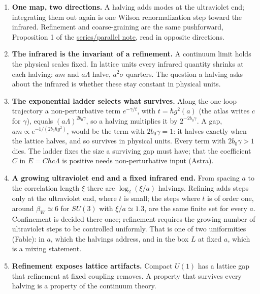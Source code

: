 \documentclass[11pt,a4paper]{article}
\newcommand{\tightlist}{\setlength{\itemsep}{0pt}\setlength{\parskip}{0pt}}
\begin{document}
\begin{enumerate}
\def\labelenumi{\arabic{enumi}.}
\tightlist
\item
  \textbf{One map, two directions.} A halving adds modes at the
  ultraviolet end; integrating them out again is one Wilson
  renormalization step toward the infrared. Refinement and
  coarse-graining are the same pushforward, Proposition 1 of the
  \href{series-parallel-gauge-refinement.md}{series/parallel note}, read
  in opposite directions.
\item
  \textbf{The infrared is the invariant of a refinement.} A continuum
  limit holds the physical scales fixed. In lattice units every infrared
  quantity shrinks at each halving: \(am\) and \(a\Lambda\) halve,
  \(a^2\sigma\) quarters. The question a halving asks about the infrared
  is whether these stay constant in physical units.
\item
  \textbf{The exponential ladder selects what survives.} Along the
  one-loop trajectory a non-perturbative term \(e^{-\gamma/t}\), with
  \(t=\hbar g^2(a)\) (the atlas writes \(c\) for \(\gamma\)), equals
  \((a\Lambda)^{2b_0\gamma}\), so a halving multiplies it by
  \(2^{-2b_0\gamma}\). A gap, \(am\propto e^{-1/(2b_0\hbar g^2)}\),
  would be the term with \(2b_0\gamma=1\): it halves exactly when the
  lattice halves, and so survives in physical units. Every term with
  \(2b_0\gamma>1\) dies. The ladder fixes the size a surviving gap must
  have; that the coefficient \(C\) in \(E=C\hbar c\Lambda\) is positive
  needs non-perturbative input (Astra).
\item
  \textbf{A growing ultraviolet end and a fixed infrared end.} From
  spacing \(a\) to the correlation length \(\xi\) there are
  \(\log_2(\xi/a)\) halvings. Refining adds steps only at the
  ultraviolet end, where \(t\) is small; the steps where \(t\) is of
  order one, around \(\beta_W\simeq6\) for \(SU(3)\) with
  \(\xi/a\simeq1.3\), are the same finite set for every \(a\).
  Confinement is decided there once; refinement requires the growing
  number of ultraviolet steps to be controlled uniformly. That is one of
  two uniformities (Fable): in \(a\), which the halvings address, and in
  the box \(L\) at fixed \(a\), which is a mixing statement.
\item
  \textbf{Refinement exposes lattice artifacts.} Compact \(U(1)\) has a
  lattice gap that refinement at fixed coupling removes. A property that
  survives every halving is a property of the continuum theory.
\end{enumerate}
\end{document}
